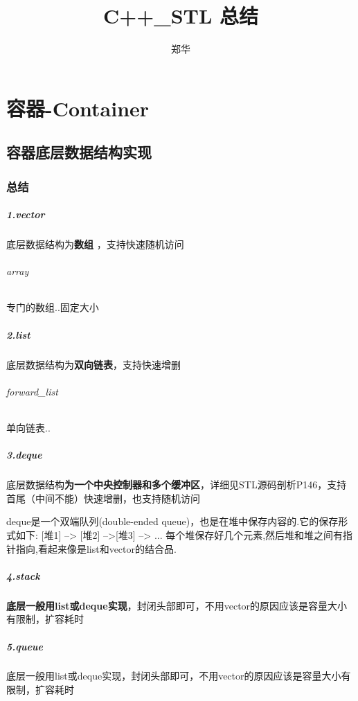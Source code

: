 \documentclass[UTF8,a4paper,12pt]{ctexbook}
\author{\kaishu 郑华}
\title{\textbf{C++\_STL 总结}}
\begin{document}
 
 	\maketitle
 	
 	\tableofcontents

\chapter{容器-Container}
\section{容器底层数据结构实现}
	\subsection{总结}
		 \paragraph{1.vector}      底层数据结构为\textbf{数组} ，支持快速随机访问
			 \subparagraph{array}  专门的数组..固定大小
		 
		 \paragraph{2.list}            底层数据结构为\textbf{双向链表}，支持快速增删
			 \subparagraph{forward\_list} 单向链表..
		 
		 \paragraph{3.deque}       底层数据结构\textbf{为一个中央控制器和多个缓冲区}，详细见STL源码剖析P146，支持首尾（中间不能）快速增删，也支持随机访问
		 
		 deque是一个双端队列(double-ended queue)，也是在堆中保存内容的.它的保存形式如下:
		 [堆1] --> [堆2] -->[堆3] --> ...
		 每个堆保存好几个元素,然后堆和堆之间有指针指向,看起来像是list和vector的结合品.
		 
		 
		 \paragraph{4.stack}         \textbf{底层一般用list或deque实现}，封闭头部即可，不用vector的原因应该是容量大小有限制，扩容耗时
		 
		 \paragraph{5.queue}     底层一般用list或deque实现，封闭头部即可，不用vector的原因应该是容量大小有限制，扩容耗时
		 
\end{document}
